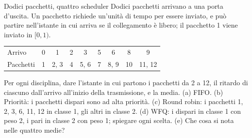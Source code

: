 \begin{esercizio}{Dodici pacchetti, quattro scheduler}
Dodici pacchetti arrivano a una porta d'uscita. Un pacchetto richiede un'unità di tempo per essere inviato, e può partire nell'istante in
cui arriva se il collegamento è libero; il pacchetto 1 viene inviato in $[0, 1)$.
\begin{center}
\begin{tabular}{lcccccccc}
\toprule
Arrivo & 0 & 1 & 2 & 3 & 5 & 6 & 8 & 9 \\
Pacchetti & 1 & 2, 3 & 4 & 5, 6 & 7 & 8, 9 & 10 & 11, 12 \\
\bottomrule
\end{tabular}
\end{center}
Per ogni disciplina, dare l'istante in cui partono i pacchetti da 2 a 12, il ritardo di ciascuno dall'arrivo all'inizio della
trasmissione, e la media. (a) FIFO. (b) Priorità: i pacchetti dispari sono ad alta priorità. (c) Round robin: i pacchetti 1, 2, 3, 6,
11, 12 in classe 1, gli altri in classe 2. (d) WFQ: i dispari in classe 1 con peso 2, i pari in classe 2 con peso 1; spiegare ogni scelta.
(e) Che cosa si nota nelle quattro medie?


\end{esercizio}
